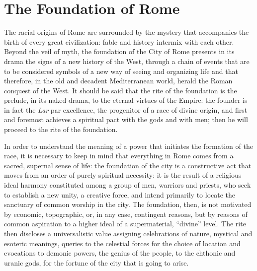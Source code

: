 \section{The Foundation of Rome}

The racial origins of Rome are surrounded by the mystery that accompanies the birth of every great civilization: fable and history intermix with each other. Beyond the veil of myth, the foundation of the City of Rome presents in its drama the signs of a new history of the West, through a chain of events that are to be considered symbols of a new way of seeing and organizing life and that therefore, in the old and decadent Mediterranean world, herald the Roman conquest of the West. It should be said that the rite of the foundation is the prelude, in its naked drama, to the eternal virtues of the Empire: the founder is in fact the \emph{Lar} par excellence, the progenitor of a race of divine origin, and first and foremost achieves a spiritual pact with the gods and with men; then he will proceed to the rite of the foundation.

In order to understand the meaning of a power that initiates the formation of the race, it is necessary to keep in mind that everything in Rome comes from a sacred, supernal sense of life: the foundation of the city is a constructive act that moves from an order of purely spiritual necessity: it is the result of a religious ideal harmony constituted among a group of men, warriors and priests, who seek to establish a new unity, a creative force, and intend primarily to locate the sanctuary of common worship in the city. The foundation, then, is not motivated by economic, topographic, or, in any case, contingent reasons, but by reasons of common aspiration to a higher ideal of a supermaterial, ``divine'' level. The rite then discloses a universalistic value assigning celebrations of nature, mystical and esoteric meanings, queries to the celestial forces for the choice of location and evocations to demonic powers, the genius of the people, to the chthonic and uranic gods, for the fortune of the city that is going to arise.

